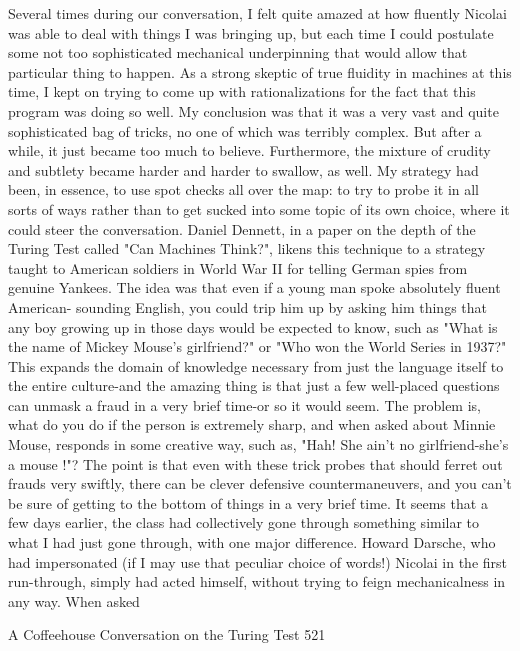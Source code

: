    Several times during our conversation, I felt quite amazed at how fluently Nicolai
was able to deal with things I was bringing up, but each time I could postulate some
not too sophisticated mechanical underpinning that would allow that particular thing
to happen. As a strong skeptic of true fluidity in machines at this time, I kept on trying
to come up with rationalizations for the fact that this program was doing so well. My
conclusion was that it was a very vast and quite sophisticated bag of tricks, no one of
which was terribly complex. But after a while, it just became too much to believe.
Furthermore, the mixture of crudity and subtlety became harder and harder to
swallow, as well.
   My strategy had been, in essence, to use spot checks all over the map: to try to
probe it in all sorts of ways rather than to get sucked into some topic of its own
choice, where it could steer the conversation. Daniel Dennett, in a paper on the depth
of the Turing Test called "Can Machines Think?", likens this technique to a strategy
taught to American soldiers in World War II for telling German spies from genuine
Yankees. The idea was that even if a young man spoke absolutely fluent American-
sounding English, you could trip him up by asking him things that any boy growing
up in those days would be expected to know, such as "What is the name of Mickey
Mouse's girlfriend?" or "Who won the World Series in 1937?" This expands the
domain of knowledge necessary from just the language itself to the entire culture-and
the amazing thing is that just a few well-placed questions can unmask a fraud in a
very brief time-or so it would seem.
   The problem is, what do you do if the person is extremely sharp, and when asked
about Minnie Mouse, responds in some creative way, such as, "Hah! She ain't no
girlfriend-she's a mouse !"? The point is that even with these trick probes that should
ferret out frauds very swiftly, there can be clever defensive countermaneuvers, and
you can't be sure of getting to the bottom of things in a very brief time.
   It seems that a few days earlier, the class had collectively gone through something
similar to what I had just gone through, with one major difference. Howard Darsche,
who had impersonated (if I may use that peculiar choice of words!) Nicolai in the first
run-through, simply had acted himself, without trying to feign mechanicalness in any
way. When asked




A Coffeehouse Conversation on the Turing Test                                         521

